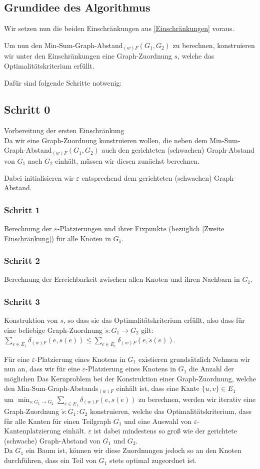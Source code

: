 \documentclass[a4paper, 12pt, twoside]{article}
\theoremstyle{Format1} %
\begin{document}
\subsection{Grundidee des Algorithmus}
Wir setzen nun die beiden Einschränkungen aus \ref{Einschränkungen} voraus.

Um nun den Min-Sum-Graph-Abstand$_{(w)F}(G_1,G_2)$ zu berechnen, konstruieren wir unter den Einschränkungen eine Graph-Zuordnung $s$, welche das Optimalitätskriterium erfüllt.

Dafür sind folgende Schritte notwenig:

\subsection{Schritt 0}
Vorbereitung der ersten Einschränkung
\\
Da wir eine Graph-Zuordnung konstruieren wollen, die neben dem Min-Sum-Graph-Abstand$_{(w)F}(G_1, G_2)$ auch den gerichteten (schwachen) Graph-Abstand von $G_1$ nach $G_2$
einhält, müssen wir diesen zunächst berechnen.

Dabei initialisieren wir $\varepsilon$ entsprechend dem gerichteten (schwachen) Graph-Abstand.
\subsubsection{Schritt 1}
Berechnung der $\varepsilon$-Platzierungen und ihrer Fixpunkte (bezüglich \ref{Zweite Einschränkung}) für alle Knoten in $G_1$.

\subsubsection{Schritt 2}
Berechnung der Erreichbarkeit zwischen allen Knoten und ihren Nachbarn in $G_1$.
\subsubsection{Schritt 3}
Konstruktion von $s$, so dass sie das Optimalitätskriterium erfüllt, also dass für eine beliebige Graph-Zuordnung $\tilde{s}: G_1 \to G_2$ gilt:
$\sum_{e \in E_1}\delta_{(w)F}(e, s(e)) \leq \sum_{e \in E_1}\delta_{(w)F}(e, \tilde{s}(e))$.

Für eine $\varepsilon$-Platzierung eines Knotens in $G_1$ existieren grundsätzlich
Nehmen wir nun an, dass wir für eine $\varepsilon$-Platzierung eines Knotens in $G_1$ die Anzahl der möglichen
Das Kernproblem bei der Konstruktion einer Graph-Zuordnung, welche den Min-Sum-Graph-Abstands$_{(w)F}$ einhält ist, dass eine Kante $\{u,v\} \in E_1$
\\
um $ \min_{s: G_1 \to G_2} \sum_{e \in E_1} \delta_{(w)F}(e, s(e))$ zu berechnen, werden wir iterativ eine Graph-Zuordnung $\tilde{s}: G_1: G_2$ konstruieren,
welche das Optimalitätskriterium, dass für alle Kanten für einen Teilgraph $G_1$ und eine Auswahl von $\varepsilon$-Kantenplatzierung einhält.
$\varepsilon$ ist dabei mindestens so groß wie der gerichtete (schwache) Graph-Abstand von $G_1$ und $G_2$.
\\
Da $G_1$ ein Baum ist, können wir diese Zuordnungen jedoch so an den Knoten durchführen, dass ein Teil von $G_1$ stets optimal zugeordnet ist.
\end{document}
